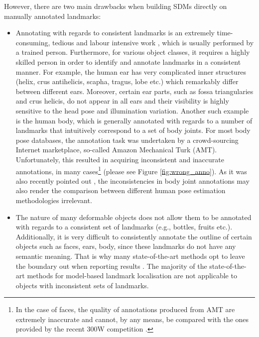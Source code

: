 However, there are two main drawbacks when building SDMs directly on manually annotated landmarks:
\begin{itemize}

\item Annotating with regards to consistent landmarks is an extremely time-consuming, tedious and labour intensive work \cite{sagonas_iccv_300w_2013}, which is usually performed by a trained person. Furthermore, for various object classes, it requires a highly skilled person in order to identify and annotate landmarks in a consistent manner. For example, the human ear has very complicated inner structures (helix, crus antihelicis, scapha, tragus, lobe etc.) which remarkably differ between different ears. Moreover, certain ear parts, such as fossa triangularies and crus helicis, do not appear in all ears and their visibility is highly sensitive to the head pose and illumination variation. Another such example is the human body, which is generally annotated with regards to a number of landmarks that intuitively correspond to a set of body joints. For most body pose databases, the annotation task was undertaken by a crowd-sourcing Internet marketplace, so-called Amazon Mechanical Turk (AMT). Unfortunately, this resulted in acquiring inconsistent and inaccurate annotations, in many cases\footnote{In the case of faces, the quality of annotations produced from AMT are extremely inaccurate and cannot, by any means, be compared with the ones provided by the recent 300W competition \cite{sagonas_iccv_300w_2013,sagonas2016faces}.} (please see Figure \ref{fig:wrong_anno}). As it was also recently pointed out \cite{tompson2015efficient}, the inconsistencies in body joint annotations may also render the comparison between different human pose estimation methodologies irrelevant.

\item The nature of many deformable objects does not allow them to be annotated with regards to a consistent set of landmarks (e.g., bottles, fruits etc.). Additionally, it is very difficult to consistently annotate the outline of certain objects such as faces, ears, body, since these landmarks do not have any semantic meaning. That is why many state-of-the-art methods opt to leave the boundary out when reporting results \cite{Tzimiropoulos2014, Asthana2014}. The majority of the state-of-the-art methods for model-based landmark localisation \cite{Cao2012, Zhu2012, Xiong2013, Tzimiropoulos2014, Asthana2014} are not applicable to objects with inconsistent sets of landmarks.

\end{itemize}

